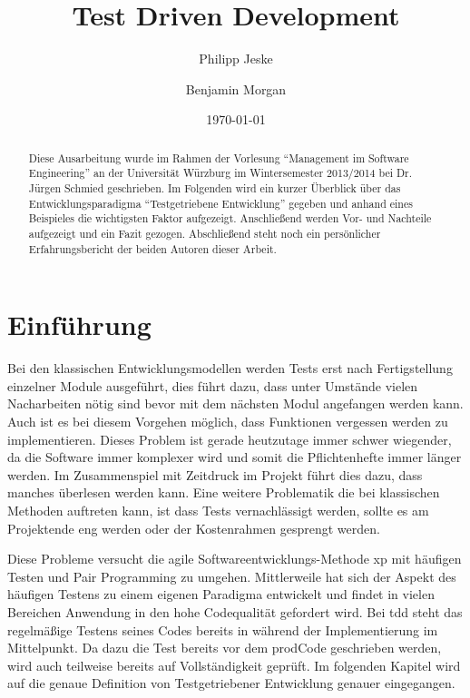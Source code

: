\documentclass{mitschrift}
\title{Test Driven Development}
\author{Philipp Jeske \and Benjamin Morgan}
\date{\today}
\newcommand{\pje}{\marginpar{Philipp\\Jeske}}
\begin{document}
\maketitle

\tableofcontents

\begin{abstract}
 Diese Ausarbeitung wurde im Rahmen der Vorlesung "`Management im Software
 Engineering"' an der Universität Würzburg im Wintersemester 2013/2014 bei Dr.
 Jürgen Schmied geschrieben. Im Folgenden wird ein kurzer Überblick über das
 Entwicklungsparadigma "`Testgetriebene Entwicklung"' gegeben und anhand eines
 Beispieles die wichtigsten Faktor aufgezeigt. Anschließend werden Vor- und
 Nachteile aufgezeigt und ein Fazit gezogen. Abschließend steht noch ein
 persönlicher Erfahrungsbericht der beiden Autoren dieser Arbeit.
\end{abstract}

\chapter{Einführung}
\pje
Bei den klassischen Entwicklungsmodellen werden Tests erst nach Fertigstellung
einzelner Module ausgeführt, dies führt dazu, dass unter Umstände vielen
Nacharbeiten nötig sind bevor mit dem nächsten Modul angefangen werden kann.
Auch ist es bei diesem Vorgehen möglich, dass Funktionen vergessen werden zu
implementieren. Dieses Problem ist gerade heutzutage immer schwer wiegender, da
die Software immer komplexer wird und somit die Pflichtenhefte immer länger
werden. Im Zusammenspiel mit Zeitdruck im Projekt führt dies dazu, dass manches
überlesen werden kann. Eine weitere Problematik die bei klassischen Methoden
auftreten kann, ist dass Tests vernachlässigt werden, sollte es am Projektende
eng werden oder der Kostenrahmen gesprengt werden.

Diese Probleme versucht die agile Softwareentwicklungs-Methode \gls{xp} mit
häufigen Testen und Pair Programming zu umgehen. Mittlerweile hat sich der
Aspekt des häufigen Testens zu einem eigenen Paradigma entwickelt und findet in
vielen Bereichen Anwendung in den hohe Codequalität gefordert wird. Bei
\gls{tdd} steht das regelmäßige Testens seines Codes bereits in während der
Implementierung im Mittelpunkt. Da dazu die Test bereits vor dem \gls{prodCode}
geschrieben werden, wird auch teilweise bereits auf Vollständigkeit geprüft. Im
folgenden Kapitel wird auf die genaue Definition von Testgetriebener
Entwicklung genauer eingegangen.
\end{document}
